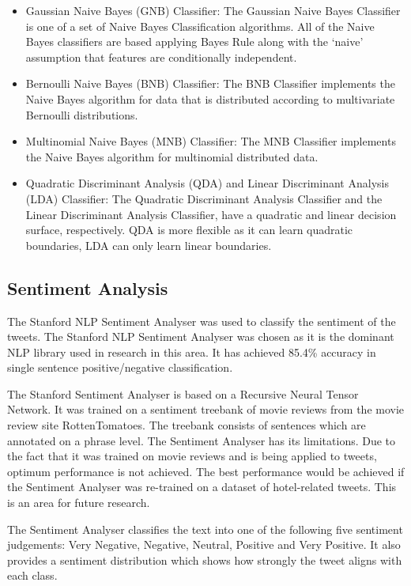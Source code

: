 \begin{itemize}
    \item Gaussian Naive Bayes (GNB) Classifier: The Gaussian Naive Bayes Classifier is one of a set of Naive Bayes Classification algorithms. All of the Naive Bayes classifiers are based applying Bayes Rule along with the ‘naive’ assumption that features are conditionally independent.
    \item Bernoulli Naive Bayes (BNB) Classifier: The BNB Classifier implements the Naive Bayes algorithm for data that is distributed according to multivariate Bernoulli distributions.
    \item Multinomial Naive Bayes (MNB) Classifier: The MNB Classifier implements the Naive Bayes algorithm for multinomial distributed data.
    \item Quadratic Discriminant Analysis (QDA) and Linear Discriminant Analysis (LDA) Classifier: The Quadratic Discriminant Analysis Classifier and the Linear Discriminant Analysis Classifier, have a quadratic and linear decision surface, respectively. QDA is more flexible as it can learn quadratic boundaries, LDA can only learn linear boundaries. 
\end{itemize}

\subsection{Sentiment Analysis}

The Stanford NLP Sentiment Analyser \cite{stanfordSentiment2013} was used to classify the sentiment of the tweets. The Stanford NLP Sentiment Analyser was chosen as it is the dominant NLP library used in research in this area. It has achieved 85.4\% accuracy in single sentence positive/negative classification. 

The Stanford Sentiment Analyser is based on a Recursive Neural Tensor Network. It was trained on a sentiment treebank of movie reviews from the movie review site RottenTomatoes. The treebank consists of sentences which are annotated on a phrase level. The Sentiment Analyser has its limitations. Due to the fact that it was trained on movie reviews and is being applied to tweets, optimum performance is not achieved. The best performance would be achieved if the Sentiment Analyser was re-trained on a dataset of hotel-related tweets. This is an area for future research.

The Sentiment Analyser classifies the text into one of the following five sentiment judgements: Very Negative, Negative, Neutral, Positive and Very Positive. It also provides a sentiment distribution which shows how strongly the tweet aligns with each class.

